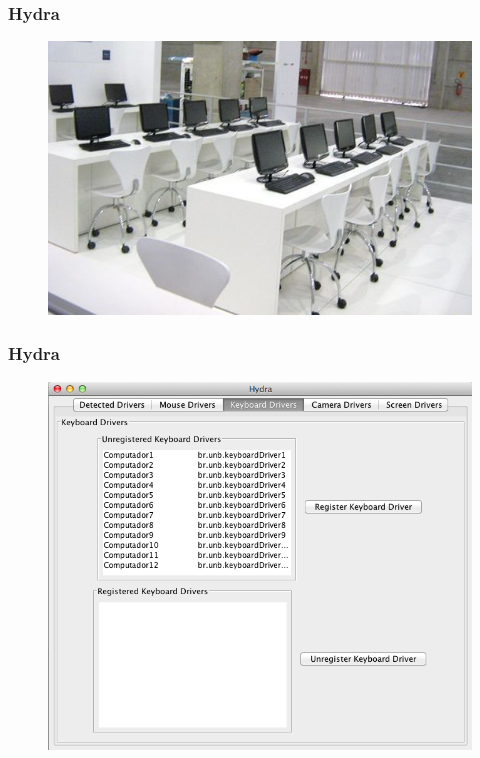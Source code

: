 \documentclass{beamer}
\begin{document}
		\begin{frame}
			\frametitle{Hydra}
			
			\begin{figure}[h]
				\centering \includegraphics[scale=.5]{figuras/sala_computadores.png}
			\end{figure}
		\end{frame}


		
		\begin{frame}
			\frametitle{Hydra}
			
			\begin{figure}[h]
				\centering \includegraphics[scale=.35]{figuras/hydra_apresentacao.png}
			\end{figure}
		\end{frame}
\end{document}
